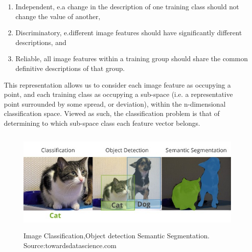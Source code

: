 \begin{enumerate}
\item Independent, e.a change in the description of one training class should not change the value of another,
\item Discriminatory, e.different image features should have significantly different descriptions, and
\item Reliable, all image features within a training group should share the common definitive descriptions of that group.
\end{enumerate}

 This representation allows us to consider each image feature as occupying a point, and each training class as occupying a sub-space (i.e. a representative point surrounded by some spread, or deviation), within the n-dimensional classification space. Viewed as such, the classification problem is that of determining to which sub-space class each feature vector belongs.
\begin{figure}[H]
  \centering
  \includegraphics[height=2in]{images/classification_detection_segmentaion_comparisons.jpeg}
   \caption{Image Classification,Object detection Semantic Segmentation. Source:towardsdatascience.com}
\end{figure}
